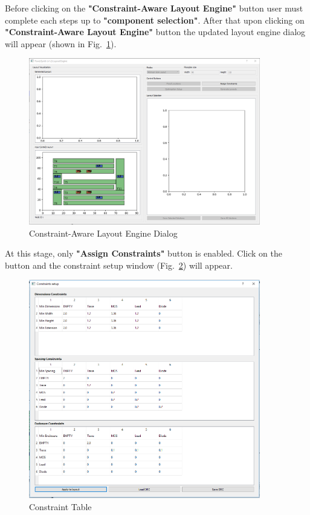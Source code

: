 \documentclass[11pt]{article}
\begin{document}
Before clicking on the \textbf{"Constraint-Aware Layout Engine"} button user must complete each steps up to \textbf{"component selection"}. After that upon clicking on \textbf{"Constraint-Aware Layout Engine"} button the updated layout engine dialog will appear (shown in Fig.~\ref{test_new_dialog}).
\begin{figure}[H]
\centering
\includegraphics[width=0.9\textwidth]{./figs/Test/start.PNG}
\caption{Constraint-Aware Layout Engine Dialog}
\label{test_new_dialog}
\end{figure}


At this stage, only \textbf{"Assign Constraints"} button is enabled. Click on the button and the constraint setup window (Fig.~\ref{cons}) will appear.
\begin{figure}[t]
\centering
\includegraphics[width=0.9\textwidth]{./figs/Test/constraint.PNG}
\caption{Constraint Table}
\label{cons}
\end{figure}
\end{document}
